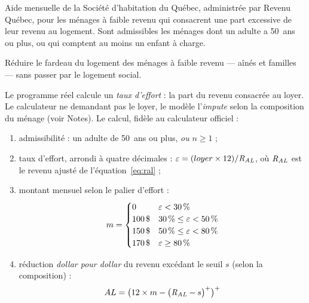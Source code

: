 
\pdesc Aide mensuelle de la Société d'habitation du Québec, administrée par
Revenu Québec, pour les ménages à faible revenu qui consacrent une part
excessive de leur revenu au logement. Sont admissibles les ménages dont un
adulte a 50~ans ou plus, ou qui comptent au moins un enfant à charge.

\pobj Réduire le fardeau du logement des ménages à faible revenu --- aînés
et familles --- sans passer par le logement social.

\pregle Le programme réel calcule un \emph{taux d'effort} : la part du
revenu consacrée au loyer. Le calculateur ne demandant pas le loyer, le
modèle l'\emph{impute} selon la composition du ménage (voir Notes). Le
calcul, fidèle au calculateur officiel :
\begin{enumerate}
  \item admissibilité : un adulte de 50~ans ou plus, \emph{ou} $n \ge 1$ ;
  \item taux d'effort, arrondi à quatre décimales :
        $\varepsilon = (loyer \times 12) / \mathit{R_{AL}}$, où $\mathit{R_{AL}}$ est le revenu
        ajusté de l'équation~\ref{eq:ral} ;
  \item montant mensuel selon le palier d'effort :
        \[
        m = \begin{cases}
        0 & \varepsilon < \num{30}\,\% \\
        \num{100}\,\$ & \num{30}\,\% \le \varepsilon < \num{50}\,\% \\
        \num{150}\,\$ & \num{50}\,\% \le \varepsilon < \num{80}\,\% \\
        \num{170}\,\$ & \varepsilon \ge \num{80}\,\%
        \end{cases}
        \]
  \item réduction \emph{dollar pour dollar} du revenu excédant le seuil
        $s$ (selon la composition) :
        \[
        AL = \bigl(12 \times m - \bigl(\mathit{R_{AL}} - s\bigr)^{+}\bigr)^{+}
        \]
\end{enumerate}

\pparams

